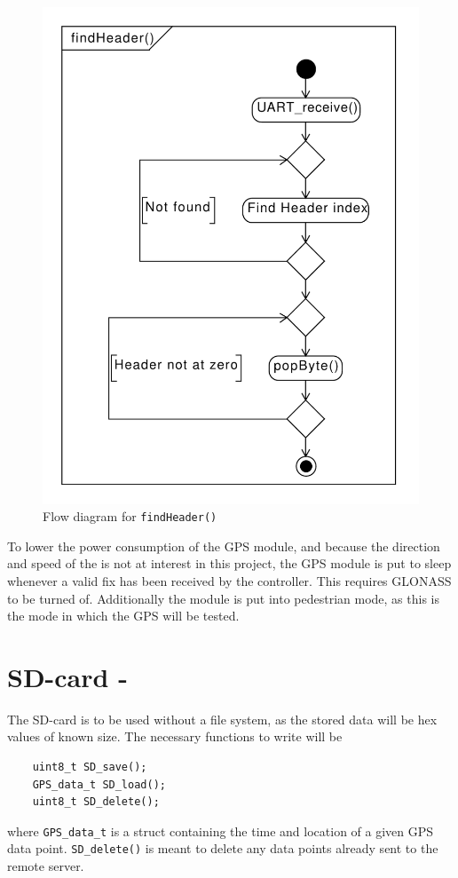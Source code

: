 \begin{figure}
	\centering
	\includegraphics[width=0.7\linewidth]{gfx/Design/GPSFlowFindHeader.pdf}
	\caption{Flow diagram for \texttt{findHeader()}}
	\label{fig:gpsflowfindheader}
\end{figure}

To lower the power consumption of the GPS module, and because the direction and speed of the \systemName is not at interest in this project, the GPS module is put to sleep whenever a valid fix has been received by the controller.
This requires GLONASS to be turned of.
Additionally the module is put into pedestrian mode, as this is the mode in which the GPS will be tested.

\section{SD-card - \SDsock}
The SD-card is to be used without a file system, as the stored data will be hex values of known size.
The necessary functions to write will be
\begin{verbatim}
	uint8_t SD_save();
	GPS_data_t SD_load();
	uint8_t SD_delete();
\end{verbatim}
where \texttt{GPS_data_t} is a struct containing the time and location of a given GPS data point.
\texttt{SD_delete()} is meant to delete any data points already sent to the remote server.


